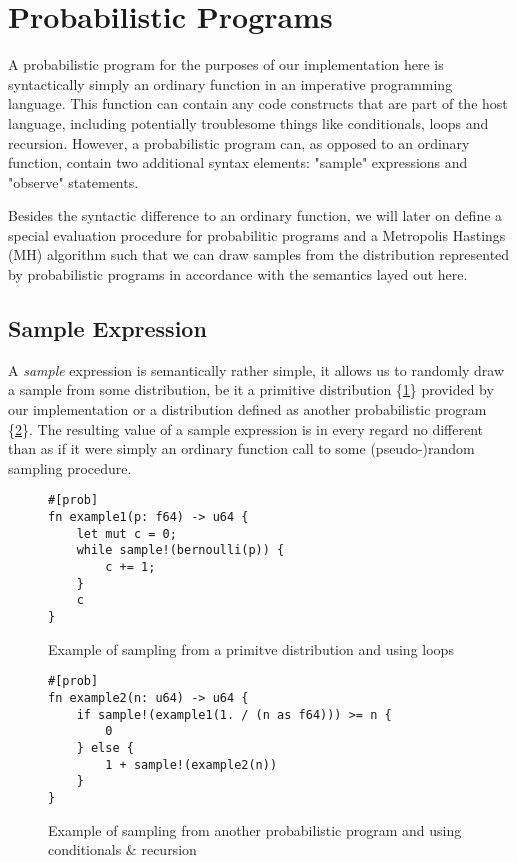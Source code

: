 \section{Probabilistic Programs}

A probabilistic program for the purposes of our implementation here is syntactically simply an ordinary function in an imperative programming language. This function can contain any code constructs that are part of the host language, including potentially troublesome things like conditionals, loops and recursion. However, a probabilistic program can, as opposed to an ordinary function, contain two additional syntax elements: "sample" expressions and "observe" statements.

Besides the syntactic difference to an ordinary function, we will later on define a special evaluation procedure for probabilitic programs and a Metropolis Hastings (MH) algorithm such that we can draw samples from the distribution represented by probabilistic programs in accordance with the semantics layed out here.

\subsection{Sample Expression}

A \textit{sample} expression is semantically rather simple, it allows us to randomly draw a sample from some distribution, be it a primitive distribution \{\ref{example1}\} provided by our implementation or a distribution defined as another probabilistic program \{\ref{example2}\}. The resulting value of a sample expression is in every regard no different than as if it were simply an ordinary function call to some (pseudo-)random sampling procedure.

\begin{figure}[h]
\begin{lstlisting}
#[prob]
fn example1(p: f64) -> u64 {
    let mut c = 0;
    while sample!(bernoulli(p)) {
        c += 1;
    }
    c
}
\end{lstlisting}
\caption{Example of sampling from a primitve distribution and using loops}
\label{example1}
\end{figure}

\begin{figure}[h]
\begin{lstlisting}
#[prob]
fn example2(n: u64) -> u64 {
    if sample!(example1(1. / (n as f64))) >= n {
        0
    } else {
        1 + sample!(example2(n))
    }
}
\end{lstlisting}
\caption{Example of sampling from another probabilistic program and using conditionals \& recursion}
\label{example2}
\end{figure}


